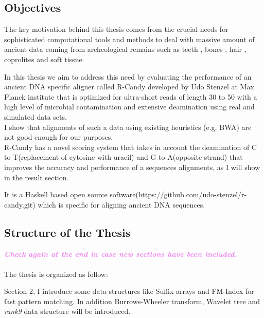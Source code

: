 \documentclass[11pt,a4paper]{report}
\begin{document}
\subsection{Objectives}

The key motivation behind this thesis comes from the crucial needs for 
sophisticated computational tools and methods to deal with massive amount of ancient data coming from archeological remains such as teeth \cite{teeth}, bones \cite{hagelberg1989ancient}, hair \cite{gilbert2004population}, coprolites \cite{coprolites} and soft tissue.

In this thesis we aim to address this need by evaluating the performance of an ancient DNA specific aligner called R-Candy developed by Udo Stenzel at Max Planck institute that is optimized for ultra-short reads of length 30 to 50 with a high level of microbial contamination and extensive deamination using real and simulated data sets. \\


I show that alignments of such a data using existing heuristics (e.g. BWA) are not good enough for our purposes.\\ 

R-Candy has a novel scoring system that takes in account the deamination of C to T(replacement of cytosine with uracil) and G to A(opposite strand) that improves the accuracy and performance of a sequences alignments, as I will show in the result section. 

It is a Haskell based open source software(https://github.com/udo-stenzel/r-candy.git) which is specific for aligning ancient DNA sequences.



\subsection{Structure of the Thesis}

\textcolor{violet}{\textbf{\emph{Check again at the end in case new sections have been included.}}}
\\\\
The thesis is organized as follow:
 
Section 2, I introduce some data structures like Suffix arrays and FM-Index for fast pattern matching. In addition Burrows-Wheeler transform, Wavelet tree and \emph{rank9} data structure will be introduced.
\end{document}
